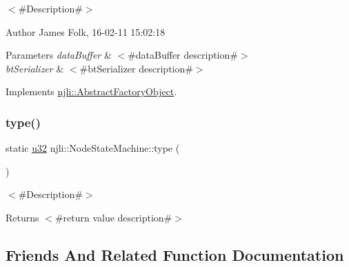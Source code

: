 $<$\#\+Description\#$>$ 

\begin{DoxyAuthor}{Author}
James Folk, 16-\/02-\/11 15\+:02\+:18
\end{DoxyAuthor}

\begin{DoxyParams}{Parameters}
{\em data\+Buffer} & $<$\#data\+Buffer description\#$>$ \\
\hline
{\em bt\+Serializer} & $<$\#bt\+Serializer description\#$>$ \\
\hline
\end{DoxyParams}


Implements \mbox{\hyperlink{classnjli_1_1_abstract_factory_object_aad2fbe86fb3bdecf02918a96b9c57976}{njli\+::\+Abstract\+Factory\+Object}}.

\mbox{\label{classnjli_1_1_node_state_machine_a79ac2de5c4c13157efc5c012e299bbc7}} 
\subsubsection{\texorpdfstring{type()}{type()}}
{\footnotesize\ttfamily static \mbox{\hyperlink{_util_8h_a10e94b422ef0c20dcdec20d31a1f5049}{u32}} njli\+::\+Node\+State\+Machine\+::type (\begin{DoxyParamCaption}{ }\end{DoxyParamCaption})\hspace{0.3cm}{\ttfamily [static]}}

$<$\#\+Description\#$>$

\begin{DoxyReturn}{Returns}
$<$\#return value description\#$>$ 
\end{DoxyReturn}


\subsection{Friends And Related Function Documentation}
\mbox{\label{classnjli_1_1_node_state_machine_acb96ebb09abe8f2a37a915a842babfac}} 
